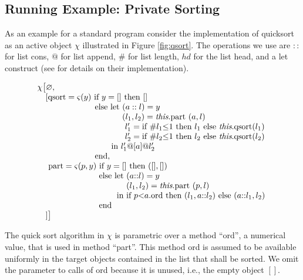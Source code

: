 \documentclass[10pt, conference, compsocconf]{IEEEtran}
\begin{document}
{\subsection{Running Example: Private Sorting} 
\label{sec:ex}
As an example for a standard program consider the implementation of 
quicksort as an active object $\chi$ illustrated in Figure \ref{fig:qsort}. 
The operations we use are $::$ for list cons,
$@$ for list append, $\#$ for list length, $hd$ for the list head, and a let construct 
(see \cite{hkl:11} for details on their implementation). 

\noindent \begin{small}
\[
 \begin{array}{l}
   \chi \big[\varnothing, \\
   \quad [ \text{qsort} = \varsigma(y)\ \text{if}\ y = []\ \text{then}\ [] \\
   \ \qquad \qquad \qquad \ \ \text{else let}\ (a::l) = y \\
   \ \qquad \qquad \qquad \qquad \qquad (l_1,l_2) = \text{{\it this}.part}\ (a, l) \\
   \ \qquad \qquad \qquad \qquad \qquad\ l_1' = \text{if}\ \#l_1 \mathord{\leq} 1\ \text{then}\ l_1\ \text{else {\it this}.qsort}(l_1) \\
   \ \qquad \qquad \qquad \qquad \qquad\ l_2' = \text{if}\ \#l_2 \mathord{\leq} 1\ \text{then}\ l_2\ \text{else {\it this}.qsort}(l_2) \\
   \ \qquad \qquad \qquad \qquad \ \ \text{in}\ l_1' @ [a] @ l_2'\ \\
   \ \qquad \qquad \qquad \ \ \text{end},\\
   \ \quad \text{part} = \varsigma(p,y)\ \text{if}\ y = []\ \text{then}\ ([],[])\\
   \ \qquad \qquad \qquad \quad\, \text{else let}\ (a\mathord{::}l) = y \\
   \ \qquad \qquad \qquad \qquad \qquad \ \, (l_1,l_2) = \text{{\it this}.part}\ (p,l) \\
   \ \qquad \qquad \qquad \qquad \quad \ \text{in if}\ p \mathord{<} a.\text{ord then}\ (l_1, a\mathord{::}l_2)\ 
                                             \text{else}\ (a\mathord{::}l_1,l_2)\ \\
   \  \qquad \qquad \qquad \quad\, \text{end}\\
   \quad ]\big]
  \end{array}
\]
\end{small}

The quick sort algorithm in $\chi$ is parametric over a method ``ord'', a numerical value, that is used in method ``part''. This method ord  is assumed to 
be available uniformly in the target objects  contained in the list that shall be sorted. We 
omit the parameter to calls of ord because it is unused, i.e., the empty object $[]$.

}
\end{document}
